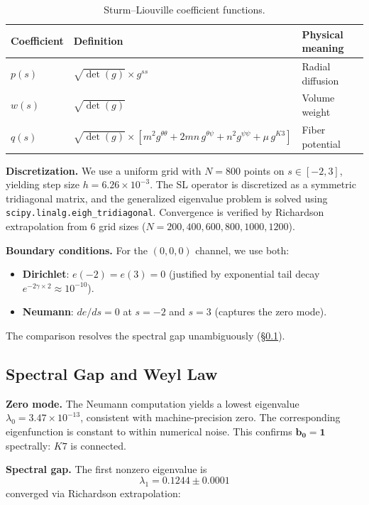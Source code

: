 \documentclass[11pt,a4paper]{article}
\newcommand{\Kseven}{K_7}
\theoremstyle{remark}
\def\Kseven{K7}%
\begin{document}
\begin{table}[htbp]
\centering
\begin{tabular}{lll}
\toprule
Coefficient & Definition & Physical meaning \\
\midrule
$p(s)$ & $\sqrt{\det(g)} \times g^{ss}$ & Radial diffusion \\
$w(s)$ & $\sqrt{\det(g)}$ & Volume weight \\
$q(s)$ & $\sqrt{\det(g)} \times [m^2 g^{\theta\theta} + 2mn\, g^{\theta\psi} + n^2 g^{\psi\psi} + \mu\, g^{K3}]$ & Fiber potential \\
\bottomrule
\end{tabular}
\caption{Sturm--Liouville coefficient functions.}
\label{tab:SL_coefficients}
\end{table}

\textbf{Discretization.} We use a uniform grid with $N = 800$ points on $s \in [-2, 3]$,
yielding step size $h = 6.26 \times 10^{-3}$. The SL operator is discretized as a symmetric
tridiagonal matrix, and the generalized eigenvalue problem is solved using
\texttt{scipy.linalg.eigh\_\allowbreak tridiagonal}. Convergence is verified by Richardson extrapolation
from 6 grid sizes ($N = 200, 400, 600, 800, 1000, 1200$).

\textbf{Boundary conditions.} For the $(0, 0, 0)$ channel, we use both:
\begin{itemize}
\item \textbf{Dirichlet}: $e(-2) = e(3) = 0$ (justified by exponential tail decay
  $e^{-2\gamma \times 2} \approx 10^{-10}$).
\item \textbf{Neumann}: $de/ds = 0$ at $s = -2$ and $s = 3$ (captures the zero mode).
\end{itemize}
The comparison resolves the spectral gap unambiguously (\S\ref{sec:gap}).

\subsection{Spectral Gap and Weyl Law}\label{sec:gap}

\textbf{Zero mode.} The Neumann computation yields a lowest eigenvalue
$\lambda_0 = 3.47 \times 10^{-13}$, consistent with machine-precision zero. The corresponding
eigenfunction is constant to within numerical noise. This confirms $\mathbf{b_0 = 1}$
spectrally: $\Kseven$ is connected.

\textbf{Spectral gap.} The first nonzero eigenvalue is
\begin{equation}
\lambda_1 = 0.1244 \pm 0.0001
\end{equation}
converged via Richardson extrapolation:
\end{document}
